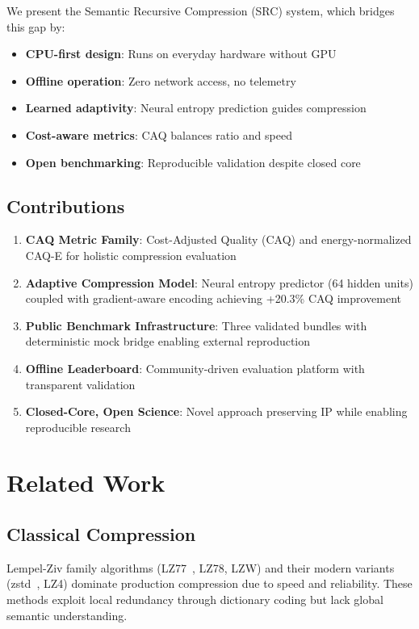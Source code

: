 \documentclass[11pt,twocolumn]{article}
\begin{document}
We present the Semantic Recursive Compression (SRC) system, which bridges this gap by:
\begin{itemize}
    \item \textbf{CPU-first design}: Runs on everyday hardware without GPU
    \item \textbf{Offline operation}: Zero network access, no telemetry
    \item \textbf{Learned adaptivity}: Neural entropy prediction guides compression
    \item \textbf{Cost-aware metrics}: CAQ balances ratio and speed
    \item \textbf{Open benchmarking}: Reproducible validation despite closed core
\end{itemize}

\subsection{Contributions}

\begin{enumerate}
    \item \textbf{CAQ Metric Family}: Cost-Adjusted Quality (CAQ) and energy-normalized CAQ-E for holistic compression evaluation
    \item \textbf{Adaptive Compression Model}: Neural entropy predictor (64 hidden units) coupled with gradient-aware encoding achieving +20.3\% CAQ improvement
    \item \textbf{Public Benchmark Infrastructure}: Three validated bundles with deterministic mock bridge enabling external reproduction
    \item \textbf{Offline Leaderboard}: Community-driven evaluation platform with transparent validation
    \item \textbf{Closed-Core, Open Science}: Novel approach preserving IP while enabling reproducible research
\end{enumerate}

\section{Related Work}

\subsection{Classical Compression}

Lempel-Ziv family algorithms (LZ77~\cite{ziv1977universal}, LZ78, LZW) and their modern variants (zstd~\cite{collet2016zstandard}, LZ4) dominate production compression due to speed and reliability. These methods exploit local redundancy through dictionary coding but lack global semantic understanding.
\end{document}

